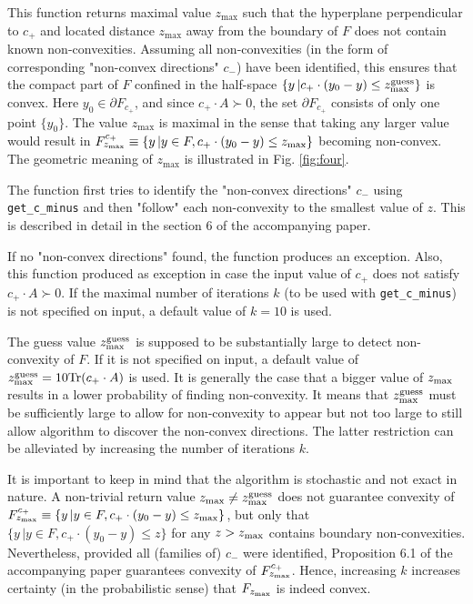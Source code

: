 \documentclass[a4paper]{article}
\theoremstyle{definition}
\begin{document}
\begin{enumerate}
This function returns maximal value $z_{\max}$ such that the hyperplane perpendicular to $c_+$ and located distance $z_{\max}$ away from the boundary of $F$ does not contain known non-convexities. Assuming all non-convexities (in the form of corresponding "non-convex directions" $c_-$) have been identified, this ensures that the compact part of $F$ confined in the half-space $\{y\, |c_+ \cdot (y_0-y)\leq z^{\rm guess}_{\rm max}\}$ is convex.
Here $y_0\in \partial F_{c_+}$, and since $c_+\cdot A\succ 0$, the set $\partial F_{c_+}$ consists of only one point $\{y_0\}$.
The value $z_{\max}$ is maximal in the sense that taking any larger value would result in $F^{c_+}_{z_{\rm max}}\equiv \{y\, | y\in F, c_+ \cdot (y_0-y)\leq z_{\rm max}\}$ becoming non-convex. The geometric meaning of $z_{\max}$ is illustrated in Fig. \ref{fig:four}. 

The function first tries to identify the "non-convex directions" $c_-$ using {\tt get\_c\_minus} and then "follow" each non-convexity to the smallest value of $z$. This is described in detail in the section 6 of the accompanying paper.

If no "non-convex directions" found, the function produces an exception.
Also, this function produced as exception in case the input value of $c_+$ does not satisfy $c_+\cdot A\succ 0$.
If the maximal number of iterations $k$ (to be used with {\tt get\_c\_minus}) is not specified on input, a default value of $k=10$ is used.

The guess value $z^{\rm guess}_{\rm max}$ is supposed to be substantially large to detect non-convexity of $F$.
If it is not specified on input, a default value of $z^{\rm guess}_{\rm max}=10 {\rm Tr}(c_+\cdot A)$ is used.
It is generally the case that a bigger value of $z_{\rm max}$ results in a lower probability of finding non-convexity.
It means that $z_{\rm max}^{\rm guess}$ must be sufficiently large to allow for non-convexity to appear but not too large to still allow algorithm to discover the non-convex directions. The latter restriction can be alleviated by increasing the number of iterations $k$.

It is important to keep in mind that the algorithm is stochastic and not exact in nature.
A non-trivial return value $z_{\max}\neq z^{\rm guess}_{\rm max}$ does not guarantee convexity of  $F^{c_+}_{z_{\rm max}}\equiv \{y\, | y\in F, c_+ \cdot (y_0-y)\leq z_{\rm max}\}$, but only that $\{y\, | y\in F,c_+ \cdot (y_0-y)\leq z\}$ for any $z>z_{\rm max}$ contains boundary non-convexities.
Nevertheless, provided all (families of) $c_-$ were identified, Proposition 6.1 of the accompanying paper guarantees convexity of $F^{c_+}_{z_{\rm max}}$. Hence, increasing $k$ increases certainty (in the probabilistic sense) that $F_{z_{\rm max}}$ is indeed convex.

\end{enumerate}
\end{document}
